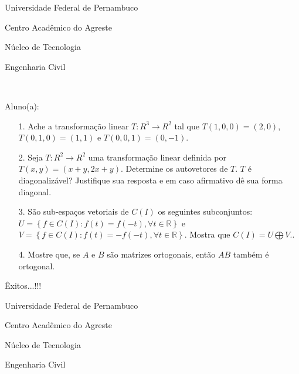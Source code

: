 \documentclass[oneside,a4paper,12pt]{article}
\newcommand{\universidade}{Universidade Federal de Pernambuco}
\newcommand{\centro}{Centro Acadêmico do Agreste}
\newcommand{\departamento}{Núcleo de Tecnologia}
\newcommand{\curso}{Engenharia Civil}
\begin{document}
	\pagestyle{empty}
	
	\begin{center}
	 	\vspace{0pt}
	 	
		\universidade
		\par
		\centro
		\par
		\departamento
		\par
		\curso
		\par
		\vspace{08pt}
		\\
	\end{center}
	
	
	\begin{flushleft}
		Aluno(a):
	\end{flushleft}
	
\begin{itemize}
\item[1.]Ache a transformação linear $T:R^{3}\longrightarrow R^{2}$ tal que $T(1,0,0)=(2,0)$, $T(0,1,0)=(1,1)$ e $T(0,0,1)=(0,-1)$.
\end{itemize}
\begin{itemize}
\item[2.] Seja $T:R^{2}\longrightarrow R^{2}$ uma transformação linear definida por $T(x,y)=(x+y,2x+y)$. Determine os autovetores de $T$. $T$ é diagonalizável? Justifique sua resposta e em caso afirmativo dê sua forma diagonal. 
 \end{itemize}
 \begin{itemize}
\item [3.] São sub-espaços vetoriais de $C(I)$ os seguintes subconjuntos: $U=\left\lbrace f\in C(I): f(t)=f(-t), \forall t\in \mathbb{R}\right\rbrace $ e $V= \left\lbrace f\in C(I): f(t)=-f(-t),\forall t\in \mathbb{R}\right\rbrace $. Mostra que $C(I)=U\bigoplus V$..
\end{itemize}
\begin{itemize}
\item[4.] Mostre que, se $A$ e $B$ são matrizes ortogonais, então $AB$ também é ortogonal.
\end{itemize}

	\flushbottom
	\flushright
     Êxitos...!!!
  \vspace{12pt}
  
     \begin{center}
     	\vspace{0pt}
     	
     	\universidade
     	\par
     	\centro
     	\par
     	\departamento
     	\par
     	\curso
     	\par
     	\vspace{08pt}
     	\\
     \end{center}
     
\end{document}
